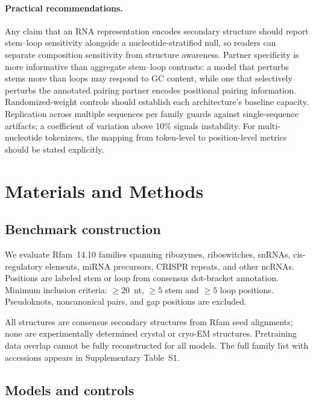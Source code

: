 \documentclass[11pt]{article}
\begin{document}
\paragraph{Practical recommendations.}
Any claim that an RNA representation encodes secondary structure should
report stem--loop sensitivity alongside a nucleotide-stratified null, so
readers can separate composition sensitivity from structure awareness.
Partner specificity is more informative than aggregate stem--loop contrasts:
a model that perturbs stems more than loops may respond to GC content, while
one that selectively perturbs the annotated pairing partner encodes
positional pairing information. Randomized-weight controls should establish
each architecture's baseline capacity. Replication across
multiple sequences per family guards against single-sequence artifacts; a
coefficient of variation above 10\% signals instability. For
multi-nucleotide tokenizers, the mapping from token-level to position-level
metrics should be stated explicitly.


\section{Materials and Methods}
\label{sec:methods}

\subsection{Benchmark construction}
\label{sec:benchmark}

We evaluate \panelN{} Rfam~14.10 families \citep{kalvari2021rfam} spanning ribozymes, riboswitches, snRNAs,
cis-regulatory elements, miRNA precursors, CRISPR repeats, and other ncRNAs.
Positions are labeled stem or loop from consensus dot-bracket annotation.
Minimum inclusion criteria: $\geq 20$~nt, $\geq 5$ stem and $\geq 5$ loop
positions. Pseudoknots, noncanonical pairs, and gap positions are excluded.

All structures are consensus secondary structures from Rfam seed alignments;
none are experimentally determined crystal or cryo-EM structures. Pretraining
data overlap cannot be fully reconstructed for all models. The full family
list with accessions appears in Supplementary Table~S1.

\subsection{Models and controls}
\label{sec:models}
\end{document}
